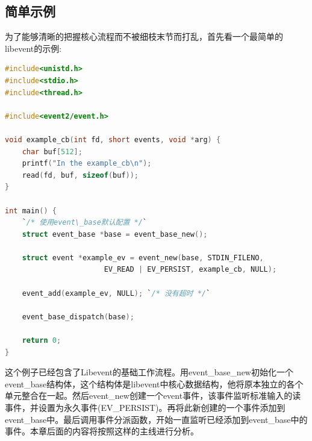 \documentclass[11pt,a4paper]{article}
\begin{document}
\subsection{简单示例}
为了能够清晰的把握核心流程而不被细枝末节而打乱，首先看一个最简单的libevent的示例:
\begin{lstlisting}[language=C]
#include<unistd.h>
#include<stdio.h>
#include<thread.h>

#include<event2/event.h>

void example_cb(int fd, short events, void *arg) {
	char buf[512];
	printf("In the example_cb\n");
	read(fd, buf, sizeof(buf));
}

int main() {
	`/* 使用event\_base默认配置 */`
	struct event_base *base = event_base_new();

	struct event *example_ev = event_new(base, STDIN_FILENO,
                       EV_READ | EV_PERSIST, example_cb, NULL);

	event_add(example_ev, NULL); `/* 没有超时 */`

	event_base_dispatch(base);

	return 0;
}
\end{lstlisting}
这个例子已经包含了Libevent的基础工作流程。用event\_base\_new初始化一个event\_base结构体，这个结构体是libevent中核心数据结构，他将原本独立的各个单元整合在一起。然后event\_new创建一个event事件，该事件监听标准输入的读事件，并设置为永久事件(EV\_PERSIST)。再将此新创建的一个事件添加到event\_base中。最后调用事件分派函数，开始一直监听已经添加到event\_base中的事件。本章后面的内容将按照这样的主线进行分析。
\end{document}
